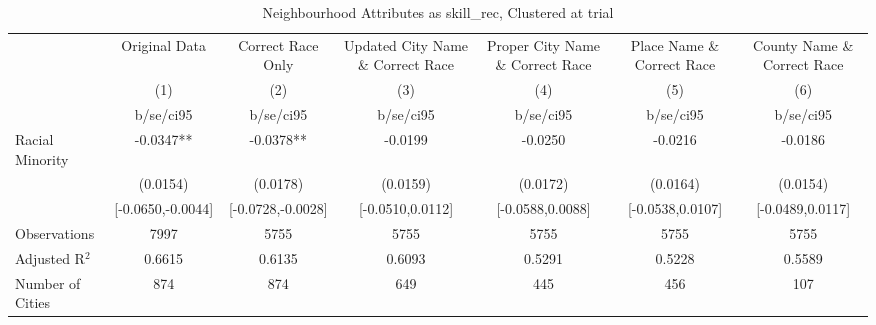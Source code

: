 \documentclass{article}
\begin{document}
\begin{table}[htbp]\centering
\def\sym#1{\ifmmode^{#1}\else\(^{#1}\)\fi}
\caption{Neighbourhood Attributes as skill\_rec, Clustered at trial}
\begin{tabular}{l*{6}{c}}
\toprule
                    &\multicolumn{1}{c}{Original Data}&\multicolumn{1}{c}{Correct Race Only}&\multicolumn{1}{c}{Updated City Name \& Correct Race}&\multicolumn{1}{c}{Proper City Name \& Correct Race}&\multicolumn{1}{c}{Place Name \& Correct Race}&\multicolumn{1}{c}{County Name \& Correct Race}\\\cmidrule(lr){2-2}\cmidrule(lr){3-3}\cmidrule(lr){4-4}\cmidrule(lr){5-5}\cmidrule(lr){6-6}\cmidrule(lr){7-7}
                    &\multicolumn{1}{c}{(1)}   &\multicolumn{1}{c}{(2)}   &\multicolumn{1}{c}{(3)}   &\multicolumn{1}{c}{(4)}   &\multicolumn{1}{c}{(5)}   &\multicolumn{1}{c}{(6)}   \\
                    &   b/se/ci95   &   b/se/ci95   &   b/se/ci95   &   b/se/ci95   &   b/se/ci95   &   b/se/ci95   \\
\midrule
Racial Minority     &     -0.0347** &     -0.0378** &     -0.0199   &     -0.0250   &     -0.0216   &     -0.0186   \\
                    &    (0.0154)   &    (0.0178)   &    (0.0159)   &    (0.0172)   &    (0.0164)   &    (0.0154)   \\
                    &[-0.0650,-0.0044]   &[-0.0728,-0.0028]   &[-0.0510,0.0112]   &[-0.0588,0.0088]   &[-0.0538,0.0107]   &[-0.0489,0.0117]   \\
\midrule
Observations        &        7997   &        5755   &        5755   &        5755   &        5755   &        5755   \\
Adjusted R$^2$      &      0.6615   &      0.6135   &      0.6093   &      0.5291   &      0.5228   &      0.5589   \\
Number of Cities    &         874   &         874   &         649   &         445   &         456   &         107   \\
\bottomrule
\end{tabular}
\end{table}
\end{document}
